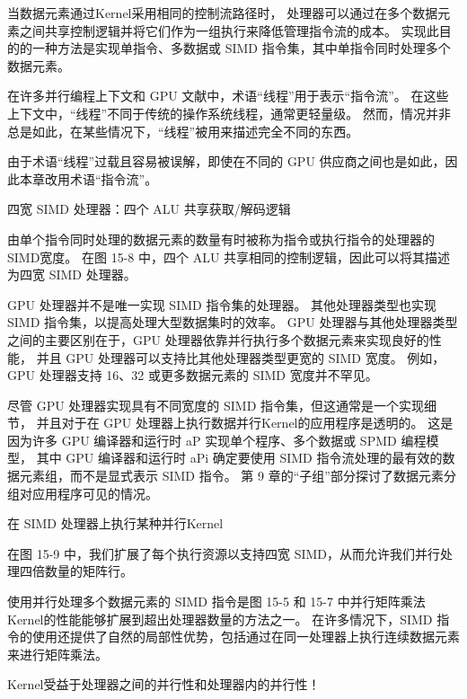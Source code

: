 当数据元素通过Kernel采用相同的控制流路径时，
处理器可以通过在多个数据元素之间共享控制逻辑并将它们作为一组执行来降低管理指令流的成本。 
实现此目的的一种方法是实现单指令、多数据或 SIMD 指令集，其中单指令同时处理多个数据元素。

\begin{remark}[线程 VS.指令流]
在许多并行编程上下文和 GPU 文献中，术语“线程”用于表示“指令流”。
在这些上下文中，“线程”不同于传统的操作系统线程，通常更轻量级。
然而，情况并非总是如此，在某些情况下，“线程”被用来描述完全不同的东西。

由于术语“线程”过载且容易被误解，即使在不同的 GPU 供应商之间也是如此，因此本章改用术语“指令流”。
\end{remark}

{\color{red} 四宽 SIMD 处理器：四个 ALU 共享获取/解码逻辑}

由单个指令同时处理的数据元素的数量有时被称为指令或执行指令的处理器的SIMD宽度。 
在图 15-8 中，四个 ALU 共享相同的控制逻辑，因此可以将其描述为四宽 SIMD 处理器。

GPU 处理器并不是唯一实现 SIMD 指令集的处理器。 
其他处理器类型也实现 SIMD 指令集，以提高处理大型数据集时的效率。 
GPU 处理器与其他处理器类型之间的主要区别在于，GPU 处理器依靠并行执行多个数据元素来实现良好的性能，
并且 GPU 处理器可以支持比其他处理器类型更宽的 SIMD 宽度。 
例如，GPU 处理器支持 16、32 或更多数据元素的 SIMD 宽度并不罕见。

\begin{remark}
尽管 GPU 处理器实现具有不同宽度的 SIMD 指令集，但这通常是一个实现细节，
并且对于在 GPU 处理器上执行数据并行Kernel的应用程序是透明的。
这是因为许多 GPU 编译器和运行时 aP 实现单个程序、多个数据或 SPMD 编程模型，
其中 GPU 编译器和运行时 aPi 确定要使用 SIMD 指令流处理的最有效的数据元素组，而不是显式表示 SIMD 指令。
第 9 章的“子组”部分探讨了数据元素分组对应用程序可见的情况。
\end{remark}

{\color{red} 在 SIMD 处理器上执行某种并行Kernel}

在图 15-9 中，我们扩展了每个执行资源以支持四宽 SIMD，从而允许我们并行处理四倍数量的矩阵行。

使用并行处理多个数据元素的 SIMD 指令是图 15-5 
和 15-7 中并行矩阵乘法Kernel的性能能够扩展到超出处理器数量的方法之一。 
在许多情况下，SIMD 指令的使用还提供了自然的局部性优势，包括通过在同一处理器上执行连续数据元素来进行矩阵乘法。

\begin{remark}
	Kernel受益于处理器之间的并行性和处理器内的并行性！
\end{remark}

